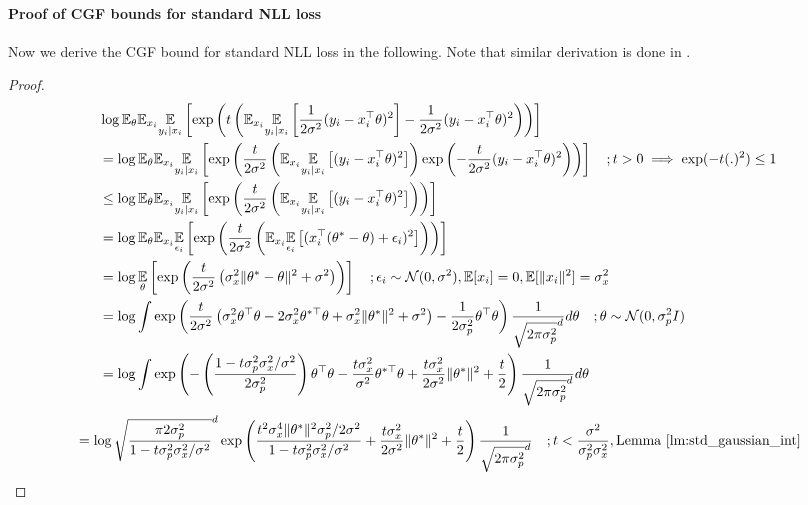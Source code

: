 \paragraph{Proof of CGF bounds for standard NLL loss}
Now we derive the CGF bound for standard NLL loss in the following. Note that similar derivation is done in \citet{germain2016pac}.
\begin{proof}
\begin{align*}
    &\log \mathbb{E}_{\theta}\mathbb{E}_{x_i}\expectation{y_i \mid x_i}{\exp \lp t \lp \mathbb{E}_{x_i}\expectation{y_i \mid x_i}{\frac{1}{2\sigma^2}(y_i - x_i^\top \theta)^2} - \frac{1}{2\sigma^2}(y_i - x_i^\top \theta)^2 \rp \rp} \\
    &= \log \mathbb{E}_{\theta}\mathbb{E}_{x_i}\expectation{y_i \mid x_i}{\exp \lp \frac{t}{2\sigma^2} \lp \mathbb{E}_{x_i}\expectation{y_i \mid x_i}{(y_i - x_i^\top \theta)^2}\rp \exp \lp - \frac{t}{2\sigma^2}(y_i - x_i^\top \theta)^2 \rp \rp} \quad; t>0 \implies \exp(-t(.)^2) \leq 1 \\
    &\leq \log \mathbb{E}_{\theta}\mathbb{E}_{x_i}\expectation{y_i \mid x_i}{\exp \lp \frac{t}{2\sigma^2} \lp \mathbb{E}_{x_i}\expectation{y_i \mid x_i}{(y_i - x_i^\top \theta)^2}\rp \rp} \\
    &= \log \mathbb{E}_{\theta}\mathbb{E}_{x_i}\expectation{\epsilon_i}{\exp \lp \frac{t}{2\sigma^2} \lp \mathbb{E}_{x_i}\expectation{\epsilon_i}{(x_i^\top (\theta^* -\theta) + \epsilon_i)^2}\rp \rp}  \\
    &= \log \expectation{\theta}{\exp \lp \frac{t}{2\sigma^2} \lp \sigma_x^2 \| \theta^* -\theta \|^2 + \sigma^2  \rp\rp} \quad; \epsilon_i \sim \mathcal{N}(0, \sigma^2), \mathbb{E}[x_i] = 0, \mathbb{E}[\|x_i\|^2] = \sigma_x^2 \\
    &= \log \int \exp \lp \frac{t}{2\sigma^2}\lp \sigma_x^2 \theta^\top \theta - 2\sigma_x^2 \theta^{*\top} \theta +  \sigma_x^2 \|\theta^*\|^2 +  \sigma^2 \rp - \frac{1}{2\sigma_p^2}\theta^\top \theta  \rp \frac{1}{\sqrt{2\pi \sigma_p^2}^d} d\theta \quad; \theta \sim \mathcal{N}(0, \sigma^2_p I) \\
    &= \log \int \exp \lp - \lp \frac{1-t\sigma_p^2 \sigma_x^2/\sigma^2}{2\sigma^2_p} \rp \theta^\top \theta - \frac{t\sigma_x^2}{\sigma^2} \theta^{*\top} \theta + \frac{t\sigma_x^2}{2\sigma^2}  \|\theta^*\|^2 + \frac{t}{2}  \rp \frac{1}{\sqrt{2\pi \sigma_p^2}^d} d\theta %
\end{align*}
\begin{align*}
    &= \log \sqrt{\frac{\pi 2 \sigma^2_p}{1-t\sigma^2_p \sigma_x^2/\sigma^2}}^d \exp \lp \frac{t^2 \sigma_x^4 \|\theta^*\|^2\sigma^2_p/2\sigma^2}{1-t\sigma_p^2 \sigma_x^2/\sigma^2} + \frac{t \sigma_x^2}{2\sigma^2} \|\theta^*\|^2 + \frac{t}{2} \rp \frac{1}{\sqrt{2\pi \sigma_p^2}^d} \quad; t< \frac{\sigma^2}{\sigma^2_p \sigma_x^2},  \text{Lemma \ref{lm:std_gaussian_int}} \\

\end{align*}
\end{proof}
